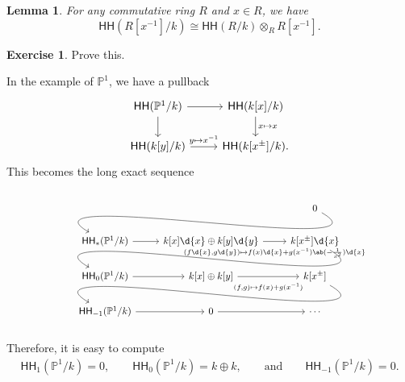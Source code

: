 \documentclass[10pt, oneside]{memoir}
\newtheorem{lem}[thm]{Lemma}
\theoremstyle{definition}
\newtheorem{exer}[thm]{Exercise}
\theoremstyle{remark}
\theoremstyle{plain}
\theoremstyle{definition}
\theoremstyle{remark}
\renewcommand{\P}{\mathbb{P}}
\newcommand{\ms}[1]{\mathsf{#1}}
\newcommand{\1}{\mathbf{1}}
\newcommand{\2}{\mathbf{2}}
\newcommand{\3}{\mathbf{3}}
\newcommand{\HH}{\ms{HH}}
\begin{document}
\begin{lem}
    For any commutative ring \(R \) and \(x \in R \), we have
    \[ \HH(R[x^{-1}]/k) \cong \HH(R/k) \otimes_R R[x^{-1}]. \]
\end{lem}

\begin{exer}
    Prove this.
\end{exer}

In the example of \(\P^1 \), we have a pullback
\begin{equation*}
\begin{tikzcd}
    \HH(\P^1/k) \ar{r} \ar{d} & \HH(k[x]/k) \ar{d}{x \mapsto x} \\
    \HH(k[y]/k) \ar{r}{y \mapsto x^{-1}} & \HH(k[x^{\pm}]/k).
\end{tikzcd}
\end{equation*}
This becomes the long exact sequence
\begin{equation*}
    \begin{tikzcd}
        & & 0 \ar[out=-30,in=150]{dll} \\
        \HH_*(\P^1/k) \rar & k[x]\d{x} \oplus k[y] \d{y} \arrow[swap, r, "{(f \d{x}, g \d{y}) \mapsto f(x)\d{x} + g(x^{-1})\ab(-\frac{1}{x^2}) \d{x}}" {yshift=-1ex}] & k[x^{\pm}] \d{x} \ar[out=-30,in=150]{dll} \\
        \HH_{0}(\P^1/k) \ar{r} & k[x] \oplus k[y] \arrow[swap, r, "{(f,g) \mapsto f(x)+g(x^{-1})}" {yshift=-1ex}] & k[x^{\pm}]\arrow[out=-30,in=150]{dll} \\
        \HH_{-1}(\P^1/k) \ar{r} & 0 \ar{r} & \cdots
    \end{tikzcd}
\end{equation*}
Therefore, it is easy to compute
\begin{align*}
    \HH_1(\P^1/k) = 0, \qquad \HH_0(\P^1/k) = k \oplus k, \qquad \text{and} \qquad \HH_{-1}(\P^1/k) = 0.
\end{align*}
\end{document}
